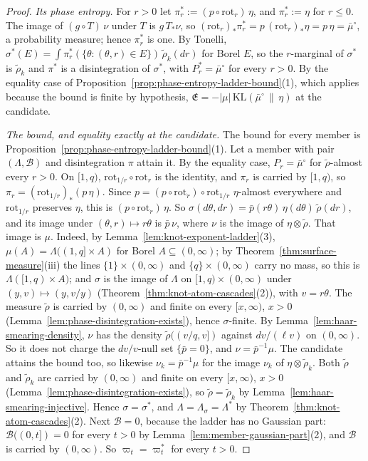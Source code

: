 \begin{proof}
\emph{Its phase entropy.} For $r > 0$ let $\pi^*_r := (p \circ \mathrm{rot}_r)\,\eta$, and
$\pi^*_r := \eta$ for $r \le 0$. The image of $(g \circ T)\,\nu$ under $T$ is $g\,T_*\nu$, so
$(\mathrm{rot}_r)_*\pi^*_r = p\,(\mathrm{rot}_r)_*\eta = p\,\eta = \bar\mu^\circ$, a probability
measure; hence $\pi^*_r$ is one. By Tonelli,
$\sigma^*(E) = \int\pi^*_r(\{\theta : (\theta, r) \in E\})\,\tilde\rho_k(dr)$ for Borel $E$, so the
$r$-marginal of $\sigma^*$ is $\tilde\rho_k$ and $\pi^*$ is a disintegration of $\sigma^*$, with
$P^*_r = \bar\mu^\circ$ for every $r > 0$. By the equality case of
Proposition~\ref{prop:phase-entropy-ladder-bound}(1), which applies because the bound is finite by
hypothesis, $\mathfrak{E} = -|\mu|\,\mathrm{KL}(\bar\mu^\circ \,\|\, \eta)$ at the candidate.

\emph{The bound, and equality exactly at the candidate.} The bound for every member is
Proposition~\ref{prop:phase-entropy-ladder-bound}(1). Let a member with pair $(\Lambda, \mathcal{B})$
and disintegration $\pi$ attain it. By the equality case, $P_r = \bar\mu^\circ$ for
$\tilde\rho$-almost every $r > 0$. On $[1,q)$, $\mathrm{rot}_{1/r} \circ \mathrm{rot}_r$ is the
identity, and $\pi_r$ is carried by $[1,q)$, so
$\pi_r = (\mathrm{rot}_{1/r})_*(p\,\eta)$. Since $p = (p \circ \mathrm{rot}_r) \circ
\mathrm{rot}_{1/r}$ $\eta$-almost everywhere and $\mathrm{rot}_{1/r}$ preserves $\eta$, this is
$(p \circ \mathrm{rot}_r)\,\eta$. So $\sigma(d\theta, dr) = \bar p(r\theta)\,\eta(d\theta)\,
\tilde\rho(dr)$, and its image under $(\theta, r) \mapsto r\theta$ is $\bar p\,\nu$, where $\nu$ is
the image of $\eta \otimes \tilde\rho$. That image is $\mu$. Indeed, by
Lemma~\ref{lem:knot-exponent-ladder}(3), $\mu(A) = \Lambda((1,q] \times A)$ for Borel
$A \subseteq (0,\infty)$; by Theorem~\ref{thm:surface-measure}(iii) the lines $\{1\} \times
(0,\infty)$ and $\{q\} \times (0,\infty)$ carry no mass, so this is $\Lambda([1,q) \times A)$; and
$\sigma$ is the image of $\Lambda$ on $[1,q) \times (0,\infty)$ under $(y, v) \mapsto (y, v/y)$
(Theorem~\ref{thm:knot-atom-cascades}(2)), with $v = r\theta$. The measure $\tilde\rho$ is carried
by $(0,\infty)$ and finite on every $[x,\infty)$, $x > 0$
(Lemma~\ref{lem:phase-disintegration-exists}), hence $\sigma$-finite. By
Lemma~\ref{lem:haar-smearing-density}, $\nu$ has the density $\tilde\rho((v/q, v])$ against
$dv/(\ell v)$ on $(0,\infty)$. So it does not charge the $dv/v$-null set $\{\bar p = 0\}$, and
$\nu = \bar p^{-1}\mu$. The candidate
attains the bound too, so likewise $\nu_k = \bar p^{-1}\mu$ for the image $\nu_k$ of
$\eta \otimes \tilde\rho_k$. Both $\tilde\rho$ and $\tilde\rho_k$ are carried by $(0,\infty)$ and
finite on every $[x,\infty)$, $x > 0$ (Lemma~\ref{lem:phase-disintegration-exists}), so
$\tilde\rho = \tilde\rho_k$ by Lemma~\ref{lem:haar-smearing-injective}. Hence $\sigma = \sigma^*$,
and $\Lambda = \Lambda_\sigma = \Lambda^*$ by Theorem~\ref{thm:knot-atom-cascades}(2). Next
$\mathcal{B} = 0$, because the ladder has no Gaussian part: $\mathcal{B}((0,t]) = 0$ for every
$t > 0$ by Lemma~\ref{lem:member-gaussian-part}(2), and $\mathcal{B}$ is carried by $(0,\infty)$. So
$\varpi_t = \varpi^*_t$ for every $t > 0$.


\end{proof}

